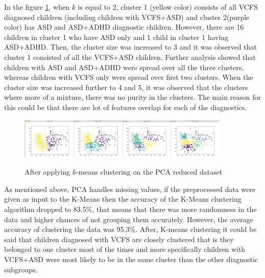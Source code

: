 In the figure \ref{fig:42}, when $k$ is equal to 2, cluster 1 (yellow color) consists of  all VCFS diagnosed children (including children with VCFS+ASD) and cluster 2(purple color) has ASD and ASD+ADHD diagnostic children. However, there are 16 children in cluster 1 who have ASD only and 1 child in cluster 1 having ASD+ADHD. Then, the cluster size was increased to 3 and it was observed that cluster 1 consisted of all the VCFS+ASD children. Further analysis showed that children with ASD and ASD+ADHD were spread over all the three clusters, whereas children with VCFS only were spread over first two clusters. When the cluster size was increased further to 4 and 5, it was observed that the clusters where more of a mixture, there was no purity in the clusters. The main reason for this could be that there are lot of features overlap for each of the diagnostics.
\begin{figure}
\centering
  {\includegraphics[width=0.9\textwidth]{Figures/Figure_4_2.png}}
  \caption{After applying $k$-means clustering on the PCA reduced dataset}
  \label{fig:42}
\end{figure}
%

As mentioned above, PCA handles missing values, if the preprocessed data were given as input to the K-Means then the accuracy of the K-Means clustering algorithm dropped to 83.5\%, that means that there was more randomness in the data and higher chances of not grouping them accurately. However, the average accuracy of clustering the data was 95.3\%. After, K-means clustering it could be said that children diagnosed with VCFS are closely clustered that is they belonged to one cluster most of the times and more specifically children with VCFS+ASD were most likely to be in the same cluster than the other diagnostic subgroups.


